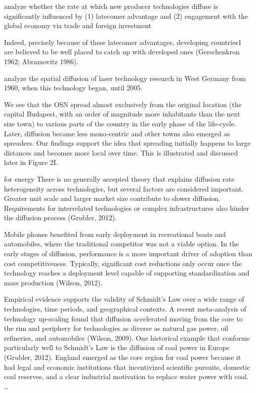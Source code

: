 \documentclass[
  authoryear,
  preprint,
  3p]{elsarticle}
\begin{document}
\citet{perkins2005international} analyze whether the rate at which new
producer technologies diffuse is significantly influenced by (1)
latecomer advantage and (2) engagement with the global economy via trade
and foreign investment

Indeed, precisely because of these latecomer advantages, developing
countries1 are believed to be well placed to catch up with developed
ones (Gerschenkron 1962; Abramovitz 1986).

\citet{fritsch2015new} analyze the spatial diffusion of laser technology
research in West Germany from 1960, when this technology began, until
2005.

\citet{perkins2011internet}

\citet{lengyel2020role} We see that the OSN spread almost exclusively
from the original location (the capital Budapest, with an order of
magnitude more inhabitants than the next size town) to various parts of
the country in the early phase of the life-cycle. Later, diffusion
became less mono-centric and other towns also emerged as spreaders. Our
findings support the idea that spreading initially happens to large
distances and becomes more local over time. This is illustrated and
discussed later in Figure 2I.

\citet{PAPAGIANNIDIS2015308}

\citet{leibowicz2016representing} for energy There is no generally
accepted theory that explains diffusion rate heterogeneity across
technologies, but several factors are considered important. Greater unit
scale and larger market size contribute to slower diffusion.
Requirements for interrelated technologies or complex infrastructures
also hinder the diffusion process (Grubler, 2012).

Mobile phones benefited from early deployment in recreational boats and
automobiles, where the traditional competitor was not a viable option.
In the early stages of diffusion, performance is a more important driver
of adoption than cost competitiveness. Typically, significant cost
reductions only occur once the technology reaches a deployment level
capable of supporting standardization and mass production (Wilson,
2012).

\citet{leibowicz2016representing} Empirical evidence supports the
validity of Schmidt's Law over a wide range of technologies, time
periods, and geographical contexts. A recent meta-analysis of technology
up-scaling found that diffusion accelerated moving from the core to the
rim and periphery for technologies as diverse as natural gas power, oil
refineries, and automobiles (Wilson, 2009). One historical example that
conforms particularly well to Schmidt's Law is the diffusion of coal
power in Europe (Grubler, 2012). England emerged as the core region for
coal power because it had legal and economic institutions that
incentivized scientific pursuits, domestic coal reserves, and a clear
industrial motivation to replace water power with coal. \ldots{}
\end{document}

